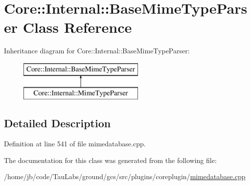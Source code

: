 \hypertarget{class_core_1_1_internal_1_1_base_mime_type_parser}{\section{\-Core\-:\-:\-Internal\-:\-:\-Base\-Mime\-Type\-Parser \-Class \-Reference}
\label{class_core_1_1_internal_1_1_base_mime_type_parser}
}
\-Inheritance diagram for \-Core\-:\-:\-Internal\-:\-:\-Base\-Mime\-Type\-Parser\-:\begin{figure}[H]
\begin{center}
\leavevmode
\includegraphics[height=2.000000cm]{class_core_1_1_internal_1_1_base_mime_type_parser}
\end{center}
\end{figure}


\subsection{\-Detailed \-Description}


\-Definition at line 541 of file mimedatabase.\-cpp.



\-The documentation for this class was generated from the following file\-:\begin{DoxyCompactItemize}
\item 
/home/jb/code/\-Tau\-Labs/ground/gcs/src/plugins/coreplugin/\hyperlink{mimedatabase_8cpp}{mimedatabase.\-cpp}\end{DoxyCompactItemize}
